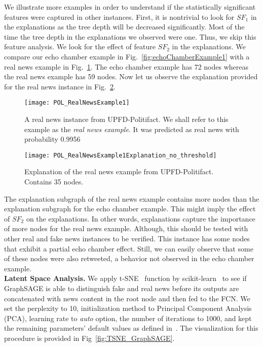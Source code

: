 We illustrate more examples in order to understand if the statistically significant features were captured in other instances. First, it is nontrivial to look for $SF_1$ in the explanations as the tree depth will be decreased significantly. Most of the time the tree depth in the explanations we observed were one. Thus, we skip this feature analysis. We look for the effect of feature $SF_2$ in the explanations. We compare our echo chamber example in Fig.~\ref{fig:echoChamberExample1} with a real news example in Fig.~\ref{fig:POL_RealNewsExample1}. The echo chamber example has 72 nodes whereas the real news example has 59 nodes. Now let us observe the explanation provided for the real news instance in Fig.~\ref{fig:POL_RealNewsExample1Explanation_no_threshold}.\\
\begin{figure}
    \centering
    \texttt{[image: POL\_RealNewsExample1]}
    \caption[A real news instance from UPFD-Politifact]{A real news instance from UPFD-Politifact. We shall refer to this example as the \emph{real news example}. It was predicted as real news with probability 0.9956}
    \label{fig:POL_RealNewsExample1}
\end{figure}
\begin{figure}
    \centering
    \texttt{[image: POL\_RealNewsExample1Explanation\_no\_threshold]}
    \caption[Explanation of the real news example from UPFD-Politifact]{Explanation of the real news example from UPFD-Politifact. Contains 35 nodes.}
    \label{fig:POL_RealNewsExample1Explanation_no_threshold}
\end{figure}
The explanation subgraph of the real news example contains more nodes than the explanation subgraph for the echo chamber example. This might imply the effect of $SF_2$ on the explanations. In other words, explanations capture the importance of more nodes for the real news example. Although, this should be tested with other real and fake news instances to be verified. This instance has some nodes that exhibit a partial echo chamber effect. Still, we can easily observe that some of these nodes were also retweeted, a behavior not observed in the echo chamber example.\\
\textbf{Latent Space Analysis.} We apply t-SNE~\parencite{tSNE_vanDerMaaten} function by scikit-learn~\parencite{ScikitLearn_Pedregosa} to see if GraphSAGE is able to distinguish fake and real news before its outputs are concatenated with news content in the root node and then fed to the FCN. We set the perplexity to 10, initialization method to Principal Component Analysis (PCA), learning rate to \emph{auto} option, the number of iterations to 1000, and kept the remaining parameters' default values as defined in~\cite{ScikitTSNE_scikit}. The visualization for this procedure is provided in Fig~\ref{fig:TSNE_GraphSAGE}.
